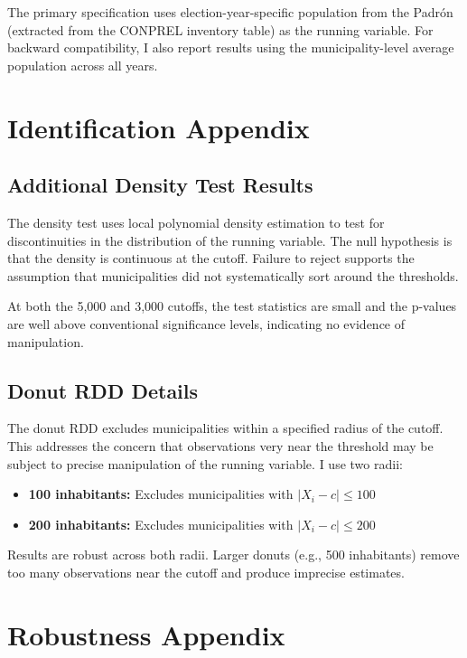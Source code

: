 \documentclass[12pt]{article}
\begin{document}
The primary specification uses election-year-specific population from the Padr\'{o}n (extracted from the CONPREL inventory table) as the running variable. For backward compatibility, I also report results using the municipality-level average population across all years.


\section{Identification Appendix}

\subsection{Additional Density Test Results}

The \citet{cattaneo2020simple} density test uses local polynomial density estimation to test for discontinuities in the distribution of the running variable. The null hypothesis is that the density is continuous at the cutoff. Failure to reject supports the assumption that municipalities did not systematically sort around the thresholds.

At both the 5,000 and 3,000 cutoffs, the test statistics are small and the p-values are well above conventional significance levels, indicating no evidence of manipulation.

\subsection{Donut RDD Details}

The donut RDD excludes municipalities within a specified radius of the cutoff. This addresses the concern that observations very near the threshold may be subject to precise manipulation of the running variable. I use two radii:

\begin{itemize}
    \item \textbf{100 inhabitants:} Excludes municipalities with $|X_i - c| \leq 100$
    \item \textbf{200 inhabitants:} Excludes municipalities with $|X_i - c| \leq 200$
\end{itemize}

Results are robust across both radii. Larger donuts (e.g., 500 inhabitants) remove too many observations near the cutoff and produce imprecise estimates.


\section{Robustness Appendix}
\end{document}
